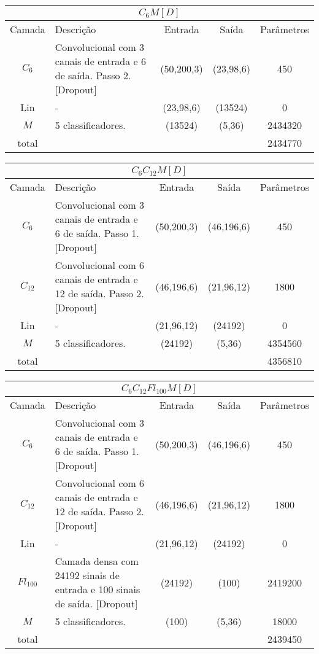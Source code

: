 \noindent
\begin{tabularx}{\linewidth}{ |c|X|c|c|c| }
	\multicolumn{5}{c}{$C_6M[D]$} \\ \hline \hline
	Camada & Descrição & Entrada & Saída & Parâmetros \\ \hline
	$C_{6}$ & Convolucional com 3 canais de entrada e 6 de saída. Passo 2.  [Dropout] & (50,200,3) & (23,98,6) & 450 \\ \hline
	Lin & - & (23,98,6) & (13524) & 0 \\ \hline
	$M$ & 5 classificadores. & (13524) & (5,36) & 2434320 \\ \hline
	total &  &  &  & 2434770 \\ \hline
\end{tabularx}

\noindent
\begin{tabularx}{\linewidth}{ |c|X|c|c|c| }
	\multicolumn{5}{c}{$C_6C_{12}M[D]$} \\ \hline \hline
	Camada & Descrição & Entrada & Saída & Parâmetros \\ \hline
	$C_{6}$ & Convolucional com 3 canais de entrada e 6 de saída. Passo 1. [Dropout]& (50,200,3) & (46,196,6) & 450 \\ \hline
	$C_{12}$ & Convolucional com 6 canais de entrada e 12 de saída. Passo 2.  [Dropout] & (46,196,6) & (21,96,12) & 1800 \\ \hline
	Lin & - & (21,96,12) & (24192) & 0 \\ \hline
	$M$ & 5 classificadores. & (24192) & (5,36) & 4354560 \\ \hline
	total &  &  &  & 4356810 \\ \hline
\end{tabularx}

\noindent
\begin{tabularx}{\linewidth}{ |c|X|c|c|c| }
	\multicolumn{5}{c}{$C_6C_{12}Fl_{100}M[D]$} \\ \hline \hline
	Camada & Descrição & Entrada & Saída & Parâmetros \\ \hline
	$C_{6}$ & Convolucional com 3 canais de entrada e 6 de saída. Passo 1.  [Dropout] & (50,200,3) & (46,196,6) & 450 \\ \hline
	$C_{12}$ & Convolucional com 6 canais de entrada e 12 de saída. Passo 2.  [Dropout] & (46,196,6) & (21,96,12) & 1800 \\ \hline
	Lin & - & (21,96,12) & (24192) & 0 \\ \hline
	$Fl_{100}$ & Camada densa com 24192 sinais de entrada e 100 sinais de saída.  [Dropout] & (24192) & (100) & 2419200 \\ \hline
	$M$ & 5 classificadores. & (100) & (5,36) & 18000 \\ \hline
	total &  &  &  & 2439450 \\ \hline
\end{tabularx}

